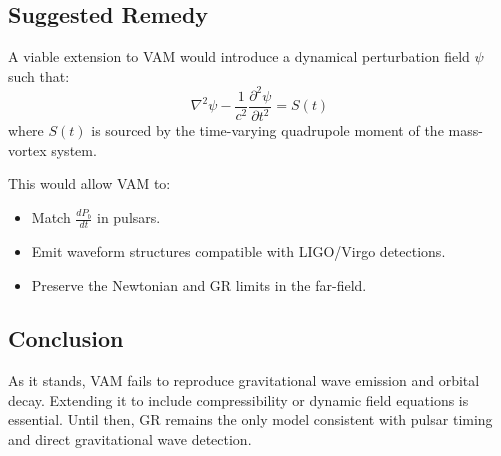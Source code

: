 \subsection*{Suggested Remedy}

A viable extension to VAM would introduce a dynamical perturbation field $\psi$ such that:
\begin{equation}
    \nabla^2 \psi - \frac{1}{c^2} \frac{\partial^2 \psi}{\partial t^2} = S(t)
\end{equation}
where $S(t)$ is sourced by the time-varying quadrupole moment of the mass-vortex system.

This would allow VAM to:
\begin{itemize}
    \item Match $\frac{dP_b}{dt}$ in pulsars.
    \item Emit waveform structures compatible with LIGO/Virgo detections.
    \item Preserve the Newtonian and GR limits in the far-field.
\end{itemize}

\subsection*{Conclusion}

As it stands, VAM fails to reproduce gravitational wave emission and orbital decay. Extending it to include compressibility or dynamic field equations is essential. Until then, GR remains the only model consistent with pulsar timing and direct gravitational wave detection.

